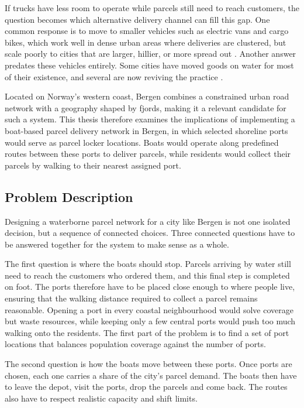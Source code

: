 \documentclass[12pt]{article}
\begin{document}
If trucks have less room to operate while parcels still need to reach customers, the question becomes which alternative delivery channel can fill this gap. One common response is to move to smaller vehicles such as electric vans and cargo bikes, which work well in dense urban areas where deliveries are clustered, but scale poorly to cities that are larger, hillier, or more spread out \parencite{NARAYANAN2022278}. Another answer predates these vehicles entirely. Some cities have moved goods on water for most of their existence, and several are now reviving the practice \parencite{dhlboats,fludis}.

Located on Norway's western coast, Bergen combines a constrained urban road network with a geography shaped by fjords, making it a relevant candidate for such a system. This thesis therefore examines the implications of implementing a boat-based parcel delivery network in Bergen, in which selected shoreline ports would serve as parcel locker locations. Boats would operate along predefined routes between these ports to deliver parcels, while residents would collect their parcels by walking to their nearest assigned port.

\subsection{Problem Description}
\label{subsec:problem-description}

Designing a waterborne parcel network for a city like Bergen is not one isolated decision, but a sequence of connected choices. Three connected questions have to be answered together for the system to make sense as a whole.

The first question is where the boats should stop. Parcels arriving by water still need to reach the customers who ordered them, and this final step is completed on foot. The ports therefore have to be placed close enough to where people live, ensuring that the walking distance required to collect a parcel remains reasonable. Opening a port in every coastal neighbourhood would solve coverage but waste resources, while keeping only a few central ports would push too much walking onto the residents. The first part of the problem is to find a set of port locations that balances population coverage against the number of ports.

The second question is how the boats move between these ports. Once ports are chosen, each one carries a share of the city's parcel demand. The boats then have to leave the depot, visit the ports, drop the parcels and come back. The routes also have to respect realistic capacity and shift limits.
\end{document}
